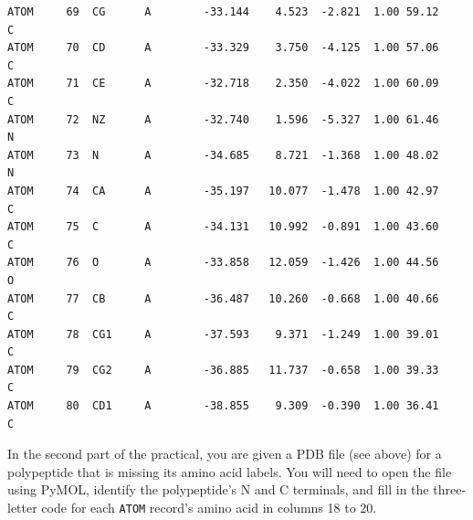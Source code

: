 \documentclass[
  letterpaper,
  DIV=11,
  numbers=noendperiod]{scrreprt}
\begin{document}
\begin{verbatim}
ATOM     69  CG      A        -33.144    4.523  -2.821  1.00 59.12           C
ATOM     70  CD      A        -33.329    3.750  -4.125  1.00 57.06           C
ATOM     71  CE      A        -32.718    2.350  -4.022  1.00 60.09           C
ATOM     72  NZ      A        -32.740    1.596  -5.327  1.00 61.46           N
ATOM     73  N       A        -34.685    8.721  -1.368  1.00 48.02           N
ATOM     74  CA      A        -35.197   10.077  -1.478  1.00 42.97           C
ATOM     75  C       A        -34.131   10.992  -0.891  1.00 43.60           C
ATOM     76  O       A        -33.858   12.059  -1.426  1.00 44.56           O
ATOM     77  CB      A        -36.487   10.260  -0.668  1.00 40.66           C
ATOM     78  CG1     A        -37.593    9.371  -1.249  1.00 39.01           C
ATOM     79  CG2     A        -36.885   11.737  -0.658  1.00 39.33           C
ATOM     80  CD1     A        -38.855    9.309  -0.390  1.00 36.41           C
\end{verbatim}

In the second part of the practical, you are given a PDB file (see
above) for a polypeptide that is missing its amino acid labels. You will
need to open the file using PyMOL, identify the polypeptide's N and C
terminals, and fill in the three-letter code for each \texttt{ATOM}
record's amino acid in columns 18 to 20.
\end{document}
